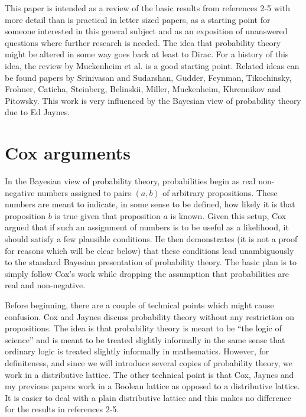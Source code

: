 \documentclass[12pt]{article}
\begin{document}
    This paper is intended as a review of the basic results from 
references 2-5 with more detail than is practical in 
letter sized papers, as a starting point for someone interested in this
general subject and as an exposition of unanswered questions
where further research is needed.  
The idea that probability theory might be altered in some way
goes back at least to Dirac\cite{dirac}.  For a history of 
this idea, the 
review by Muckenheim et al.\cite{muckenheimetal} is a good starting point.  
Related ideas can be found papers by Srinivasan and
Sudarshan\cite{srinivasan1,srinivasan2,srinivasan3},
Gudder\cite{gudder}, Feynman\cite{feynman},  Tikochinsky\cite{tikochinsky}, Frohner\cite{frohner},
Caticha\cite{caticha}, Steinberg\cite{steinberg}, Belinskii\cite{belinskii}, 
Miller\cite{miller}, Muckenheim\cite{muckenheim}, Khrennikov\cite{khrennikov} and Pitowsky\cite{pitowsky}.  This work is very  
influenced by the Bayesian view of probability theory due to 
Ed Jaynes\cite{jaynes1,jaynes2,jaynes3,ejaynes}.

\section{Cox arguments}

     In the Bayesian view of probability theory, probabilities begin as 
real non-negative numbers assigned to pairs $(a,b)$ of arbitrary propositions.
These numbers are meant to indicate, in some sense to be defined, how likely 
it is that proposition $b$ is true given that proposition $a$ is known. Given 
this setup,  Cox argued\cite{cox} that if such an assignment of numbers is to be useful as
 a likelihood, it should satisfy a few plausible conditions.  He then demonstrates 
(it is not a proof for reasons which will be clear below) that these conditions lead
unambiguously to the standard Bayesian presentation of probability theory.
The basic plan is to simply follow Cox's work while dropping the assumption
that probabilities are real and non-negative.  

    Before beginning, there are a couple of technical points which might 
cause confusion.  Cox\cite{cox} and Jaynes\cite{ejaynes} discuss probability theory without any
restriction on propositions. 
The idea is that probability theory is
meant to be ``the logic of science'' and is meant to be treated slightly 
informally in the same sense that ordinary logic is treated slightly 
informally in mathematics.  However, for definiteness, and since we will
introduce several copies of probability theory, we work in a distributive 
lattice.  The other technical point is that Cox, Jaynes and my previous 
papers work in a Boolean lattice as opposed to a distributive lattice.
It is easier to deal with a plain distributive lattice and this makes no 
difference for the results in references 2-5.
\end{document}
